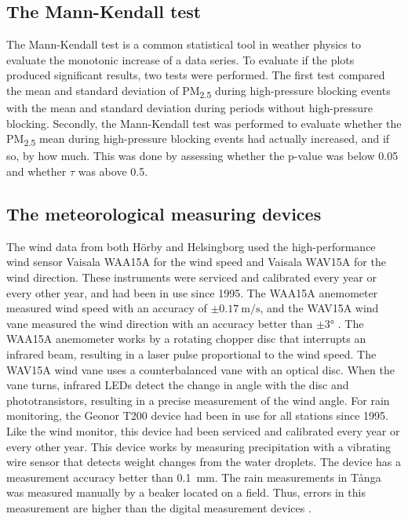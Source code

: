 \subsection{The Mann-Kendall test}
The Mann-Kendall test is a common statistical tool in weather physics to evaluate the monotonic increase of a data series. To evaluate if the plots produced significant results, two tests were performed. The first test compared the mean and standard deviation of PM\textsubscript{2.5} during high-pressure blocking events with the mean and standard deviation during periods without high-pressure blocking. Secondly, the Mann-Kendall test was performed to evaluate whether the PM\textsubscript{2.5} mean during high-pressure blocking events had actually increased, and if so, by how much. This was done by assessing whether the p-value was below 0.05 and whether $\tau$ was above 0.5.

\subsection{The meteorological measuring devices}
The wind data from both Hörby and Helsingborg used the high-performance wind sensor Vaisala WAA15A for the wind speed and Vaisala WAV15A for the wind direction. These instruments were serviced and calibrated every year or every other year, and had been in use since 1995. The WAA15A anemometer measured wind speed with an accuracy of $\pm\SI{0.17}{\m\per\s}$, and the WAV15A wind vane measured the wind direction with an accuracy better than $\pm\ang{3}$ \cite{vaisalaWindSetWA152021}. The WAA15A anemometer works by a rotating chopper disc that interrupts an infrared beam, resulting in a laser pulse proportional to the wind speed. The WAV15A wind vane uses a counterbalanced vane with an optical disc. When the vane turns, infrared LEDs detect the change in angle with the disc and phototransistors, resulting in a precise measurement of the wind angle. For rain monitoring, the Geonor T200 device had been in use for all stations since 1995. Like the wind monitor, this device had been serviced and calibrated every year or every other year. This device works by measuring precipitation with a vibrating wire sensor that detects weight changes from the water droplets\cite{geonorinc.T200BSeriesAll2019}. The device has a measurement accuracy better than \SI{0.1}{\mm}. The rain measurements in Tånga was measured manually by a beaker located on a field. Thus, errors in this measurement are higher than the digital measurement devices . 

